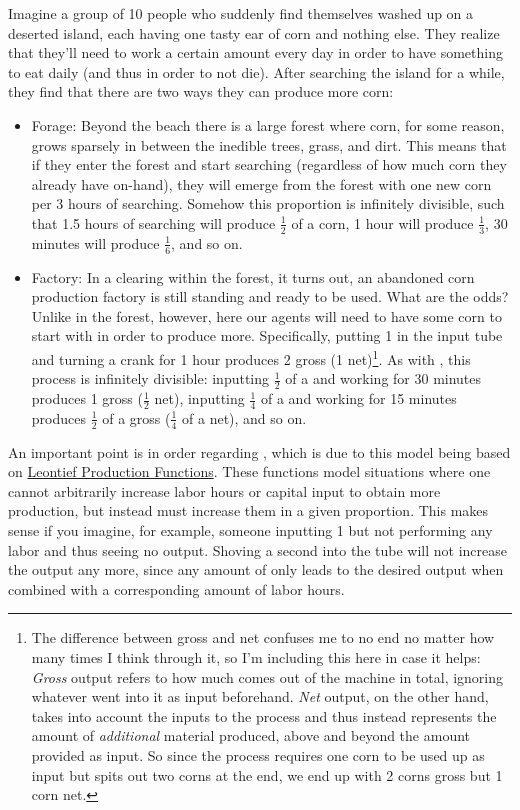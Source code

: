 Imagine a group of 10 people who suddenly find themselves washed up on a deserted island, each having one tasty ear of corn and nothing else. They realize that they'll need to work a certain amount every day in order to have something to eat daily (and thus in order to not die). After searching the island for a while, they find that there are two ways they can produce more corn:
\begin{itemize}
    \item \textsf{Forage}: Beyond the beach there is a large forest where corn, for some reason, grows sparsely in between the inedible trees, grass, and dirt. This means that if they enter the forest and start searching (regardless of how much corn they already have on-hand), they will emerge from the forest with one new corn per 3 hours of searching. Somehow this proportion is infinitely divisible, such that 1.5 hours of searching will produce $\frac{1}{2}$ of a corn, 1 hour will produce $\frac{1}{3}$, 30 minutes will produce $\frac{1}{6}$, and so on.
    \item \textsf{Factory}: In a clearing within the forest, it turns out, an abandoned corn production factory is still standing and ready to be used. What are the odds? Unlike in the forest, however, here our agents will need to have some corn to start with in order to produce more. Specifically, putting 1 \Corn{} in the input tube and turning a crank for 1 hour produces 2  gross (1 \Corn{} net)\footnote{The difference between gross and net confuses me to no end no matter how many times I think through it, so I'm including this here in case it helps: \textit{Gross} output refers to how much comes out of the machine in total, ignoring whatever went into it as input beforehand. \textit{Net} output, on the other hand, takes into account the inputs to the process and thus instead represents the amount of \textit{additional} material produced, above and beyond the amount provided as input. So since the  process requires one corn to be used up as input but spits out two corns at the end, we end up with 2 corns gross but 1 corn net.}. As with , this process is infinitely divisible: inputting $\frac{1}{2}$ of a \Corn{} and working for 30 minutes produces 1 \Corn{} gross ($\frac{1}{2}$ \Corn{} net), inputting $\frac{1}{4}$ of a \Corn{} and working for 15 minutes produces $\frac{1}{2}$ of a \Corn{} gross ($\frac{1}{4}$ of a \Corn{} net), and so on.
\end{itemize}

An important point is in order regarding , which is due to this model being based on \href{https://en.wikipedia.org/wiki/Leontief\_production\_function}{Leontief Production Functions}. These functions model situations where one cannot arbitrarily increase labor hours or capital input to obtain more production, but instead must increase them in a given proportion. This makes sense if you imagine, for example, someone inputting 1 \Corn{} but not performing any labor and thus seeing no output. Shoving a second \Corn{} into the tube will not increase the output any more, since any amount of \Corn{} only leads to the desired output when combined with a corresponding amount of labor hours.

